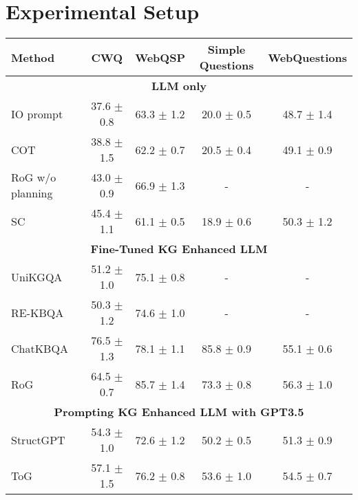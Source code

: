 \section{Experimental Setup}\label{sec:exp}
\begin{table*}[ht]
\centering
\tabcolsep=0.35cm
\begin{tabular}{lcccc}
\toprule
\textbf{Method}              & \textbf{CWQ} & \textbf{WebQSP} & \textbf{Simple Questions} & \textbf{WebQuestions} \\ 
\midrule
\multicolumn{5}{c}{\textbf{LLM only}} \\
\midrule
IO prompt~\cite{ioprompt}                    & 37.6 $\pm$ 0.8         & 63.3 $\pm$ 1.2            & 20.0 $\pm$ 0.5              & 48.7 $\pm$ 1.4               \\ 
COT~\cite{cot}                          & 38.8 $\pm$ 1.5         & 62.2 $\pm$ 0.7            & 20.5 $\pm$ 0.4              & 49.1 $\pm$ 0.9               \\ 
RoG w/o planning~\cite{rog}             & 43.0 $\pm$ 0.9         & 66.9 $\pm$ 1.3            & -                 & -                  \\ 
SC~\cite{sc}                           & 45.4 $\pm$ 1.1         & 61.1 $\pm$ 0.5            & 18.9 $\pm$ 0.6              & 50.3 $\pm$ 1.2               \\ 
\midrule
\multicolumn{5}{c}{\textbf{Fine-Tuned KG Enhanced LLM}} \\ 
\midrule
UniKGQA~\cite{unikgqa}           & 51.2 $\pm$ 1.0         & 75.1 $\pm$ 0.8          & -        & -         \\
RE-KBQA~\cite{re-kbqa}  & 50.3 $\pm$ 1.2         & 74.6 $\pm$ 1.0            & -                 & -        \\
ChatKBQA~\cite{chatkbqa}                     & 76.5 $\pm$ 1.3         & 78.1 $\pm$ 1.1            & 85.8 $\pm$ 0.9              & 55.1 $\pm$ 0.6                  \\ 
RoG~\cite{rog}     & 64.5 $\pm$ 0.7         & 85.7 $\pm$ 1.4            & 73.3 $\pm$ 0.8    & 56.3 $\pm$ 1.0               \\ 
\midrule
\multicolumn{5}{c}{\textbf{Prompting KG Enhanced LLM with GPT3.5}} \\ 
\midrule
StructGPT~\cite{structgpt}      & 54.3 $\pm$ 1.0         & 72.6 $\pm$ 1.2        & 50.2 $\pm$ 0.5      & 51.3 $\pm$ 0.9          \\
ToG~\cite{tog}                          & 57.1 $\pm$ 1.5         & 76.2 $\pm$ 0.8            & 53.6 $\pm$ 1.0              & 54.5 $\pm$ 0.7               \\ 

\end{tabular}
\end{table*}
